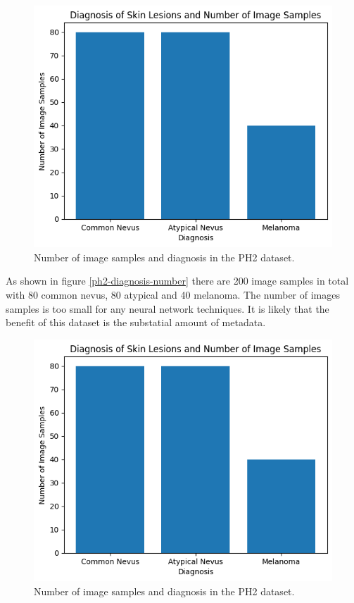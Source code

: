 \begin{figure}
	\centering
	\includegraphics[scale=0.8]{images/ph2/ph2-diagnosis-number.png}
	\caption{Number of image samples and diagnosis in the PH2 dataset.} 
\end{figure} \label{ph2-diagnosis-number}

As shown in figure \ref{ph2-diagnosis-number} there are 200 image samples in total with 80 common nevus, 80 atypical and 40 melanoma. The number of images samples is too small for any neural network techniques. It is likely that the benefit of this dataset is the substatial amount of metadata.

\begin{figure}
	\centering
	\includegraphics[scale=0.8]{images/ph2/ph2-diagnosis-number.png}
	\caption{Number of image samples and diagnosis in the PH2 dataset.} 
\end{figure} \label{ph2-diagnosis-number}

